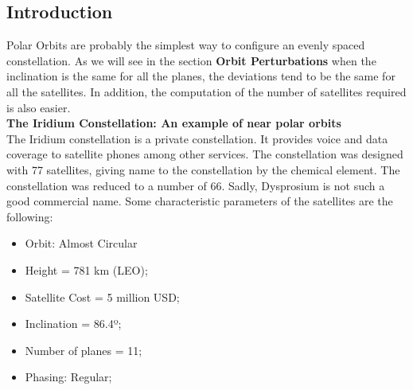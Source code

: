%

\subsection{Introduction}
Polar Orbits are probably the simplest way to configure an evenly spaced constellation. As we will see in the section \textbf{Orbit Perturbations} when the inclination is the same for all the planes, the deviations tend to be the same for all the satellites. In addition, the computation of the number of satellites required is also easier.
\\
\textbf{The Iridium Constellation: An example of near polar orbits}
\\
The Iridium constellation is a private constellation. It provides voice and data coverage to satellite phones among other services. The constellation was designed with 77 satellites, giving name to the constellation by the chemical element. The constellation was reduced to a number of 66. Sadly, Dysprosium is not such a good commercial name. Some characteristic parameters of the satellites are the following:

\begin{itemize}
\item Orbit: Almost Circular
\item Height = 781 km (LEO);
\item Satellite Cost = 5 million USD;
\item Inclination = 86.4º;
\item Number of planes = 11;
\item Phasing: Regular;
\end{itemize}

